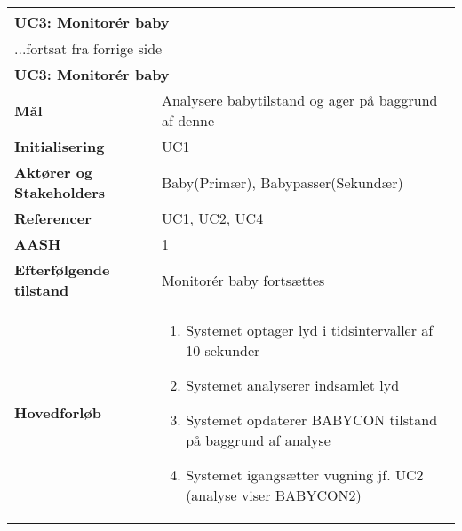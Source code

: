 \begin{center} \centering \label{kravspec:uc3}
	\begin{longtable}{|p{5cm}|p{9cm}|}  %
	\hline
		\multicolumn{2}{|l|}{\textbf{UC3: Monitorér baby}} \\\hline %
		\endfirsthead
		
		\multicolumn{2}{l}{...fortsat fra forrige side} \\ \hline %
		\multicolumn{2}{|l|}{\textbf{UC3: Monitorér baby}} \\\hline %
		\endhead	
		
		\textbf{Mål}							&Analysere babytilstand og ager på baggrund af denne	\\\hline
		\textbf{Initialisering}				&UC1		\\\hline
		\textbf{Aktører og Stakeholders}		&Baby(Primær), Babypasser(Sekundær)		\\\hline 
		\textbf{Referencer}					&UC1, UC2, UC4		\\\hline
		\textbf{AASH}						&1		\\\hline
		\textbf{Efterfølgende tilstand}		&Monitorér baby fortsættes		\\\hline
		\textbf{Hovedforløb}					
			&\begin{enumerate}
					
				\item \label{kravspec:uc3_optagelse}Systemet optager lyd i tidsintervaller af 10 sekunder 				
				
				\item Systemet analyserer indsamlet lyd 
				
				\item Systemet opdaterer BABYCON tilstand på baggrund af analyse
				
				\item \label{kravspec:uc3_lydanalyse}Systemet igangsætter vugning jf. UC2 (analyse viser BABYCON2)			
				\newline [Und: \ref{kravspec:uc3_lydanalyse}.a Vugning allerede igang (forrige analyse viste BABYCON2)]
				\newline [Und: \ref{kravspec:uc3_lydanalyse}.b Analyse viser BABYCON3 (forrige analyse viste BABYCON2)]
				\newline [Und: \ref{kravspec:uc3_lydanalyse}.c Analyse viser BABYCON3 (forrige analyse viste BABYCON3)]
				\newline [Und: \ref{kravspec:uc3_lydanalyse}.d Analyse viser BABYCON1]
				

\end{enumerate}
\end{longtable}
\end{center}
